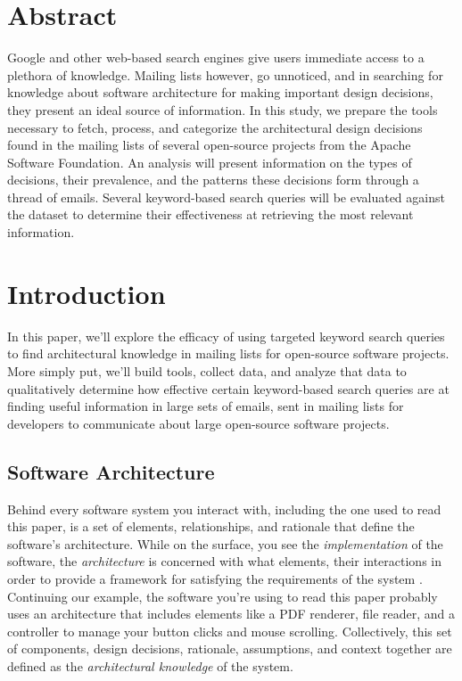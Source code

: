 \documentclass[a4paper, 12pt]{article}
\begin{document}


\section{Abstract}
	Google and other web-based search engines give users immediate access to a plethora of knowledge. Mailing lists however, go unnoticed, and in searching for knowledge about software architecture for making important design decisions, they present an ideal source of information. In this study, we prepare the tools necessary to fetch, process, and categorize the architectural design decisions found in the mailing lists of several open-source projects from the Apache Software Foundation. An analysis will present information on the types of decisions, their prevalence, and the patterns these decisions form through a thread of emails. Several keyword-based search queries will be evaluated against the dataset to determine their effectiveness at retrieving the most relevant information.



\section{Introduction}
	In this paper, we'll explore the efficacy of using targeted keyword search queries to find architectural knowledge in mailing lists for open-source software projects. More simply put, we'll build tools, collect data, and analyze that data to qualitatively determine how effective certain keyword-based search queries are at finding useful information in large sets of emails, sent in mailing lists for developers to communicate about large open-source software projects.
	
	\subsection{Software Architecture}
		Behind every software system you interact with, including the one used to read this paper, is a set of elements, relationships, and rationale that define the software's architecture. While on the surface, you see the \textit{implementation} of the software, the \textit{architecture} is concerned with what elements, their interactions in order to provide a framework for satisfying the requirements of the system \cite{perry}. Continuing our example, the software you're using to read this paper probably uses an architecture that includes elements like a PDF renderer, file reader, and a controller to manage your button clicks and mouse scrolling. Collectively, this set of components, design decisions, rationale, assumptions, and context together are defined as the \textit{architectural knowledge} of the system\cite{denboon}.
		
\end{document}
